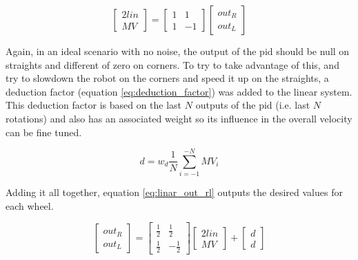 \documentclass[runningheads]{llncs}
\begin{document}
\begin{equation}
    \begin{bmatrix}
        2 lin \\
        MV
    \end{bmatrix}
    =
    \begin{bmatrix}
        1 & 1 \\
        1 & -1 
    \end{bmatrix}
    \begin{bmatrix}
        out_R \\
        out_L
    \end{bmatrix}
    \label{eq:linar_out_rl_basic}
\end{equation}

Again, in an ideal scenario with no noise, the output of the \gls{pid} should be null on straights and different of zero on corners. To try to take advantage of this, and try to slowdown the robot on the corners and speed it up on the straights, a deduction factor (equation \ref{eq:deduction_factor}) was added to the linear system. This deduction factor is based on the last $N$ outputs of the \gls{pid} (i.e. last $N$ rotations) and also has an associated weight so its influence in the overall velocity can be fine tuned.

\begin{equation}
    d = w_d {\frac {1}{N}}\sum _{i=-1}^{-N}MV_{i}
    \label{eq:deduction_factor}
\end{equation}

Adding it all together, equation \ref{eq:linar_out_rl} outputs the desired values for each wheel.

\begin{equation}
    \begin{bmatrix}
        out_R \\
        out_L
    \end{bmatrix}
    =
    \begin{bmatrix}
        \frac{1}{2} & \frac{1}{2} \\
        \frac{1}{2} & -\frac{1}{2}
    \end{bmatrix}
    \begin{bmatrix}
        2 lin \\
        MV
    \end{bmatrix}
    +
    \begin{bmatrix}
        d \\
        d
    \end{bmatrix}
    \label{eq:linar_out_rl}
\end{equation}
\end{document}
